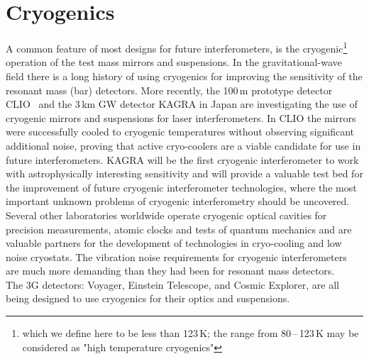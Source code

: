 \chapter{Cryogenics}
\label{sec:Cryogenics}
\vspace{-2cm} %
A common feature of most designs for future interferometers, is the cryogenic\footnote{which we define here to be less than 123\,K; the range from 80\,--\,123\,K may be considered as "high temperature cryogenics"} operation of the test mass mirrors\cite{ET2011, ISWP:2018} and suspensions. In the gravitational-wave field there is a long history of using cryogenics for improving the sensitivity of the resonant mass (bar) detectors\cite{ColdBars}. 
More recently, the 100\,m prototype detector CLIO~\cite{CLIO:2008} and the 3\,km GW detector KAGRA\cite{KAGRA2013} in Japan are investigating the use of cryogenic mirrors and suspensions for laser interferometers.
In CLIO the mirrors were successfully cooled to cryogenic temperatures without observing significant additional noise, proving that active cryo-coolers are a viable candidate for use in future interferometers. KAGRA will be the first cryogenic interferometer to work with astrophysically interesting sensitivity and will provide a valuable test bed for the improvement of future cryogenic interferometer technologies, where the most important unknown problems of cryogenic interferometry should be uncovered. Several other laboratories worldwide operate cryogenic optical cavities for precision measurements\cite{Holger:Munich}, atomic clocks\cite{JunYegroup} and tests of quantum mechanics\cite{CaltechIQIM} and are valuable partners for the development of technologies in cryo-cooling and low noise cryostats. The vibration noise requirements for cryogenic interferometers are much more demanding than they had been for resonant mass detectors.\\
The 3G detectors: Voyager\cite{Voyager:Inst}, Einstein Telescope\cite{Sathyaprakash:2012jt}, and Cosmic Explorer\cite{CosmicExplorer2017}, are all being designed to use cryogenics for their optics and suspensions.

